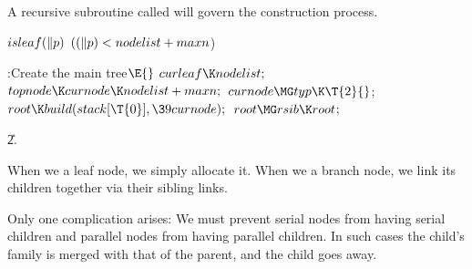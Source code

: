 A recursive subroutine called  will govern the
construction process.

\Y\B\4\D$\\{isleaf}(\|p)$ \5
$((\|p)<\\{nodelist}+\\{maxn}{}$)\par
\Y\B\4:Create the main tree\X${}\E{}$\6
$\\{curleaf}\K\\{nodelist};{}$\6
${}\\{topnode}\K\\{curnode}\K\\{nodelist}+\\{maxn};{}$\6
${}\\{curnode}\MG\\{typ}\K\T{2}{}$;\6
${}\\{root}\K\\{build}(\\{stack}[\T{0}],\39\\{curnode});{}$\6
${}\\{root}\MG\\{rsib}\K\\{root}{}$;\par
\U2.\fi

When we  a leaf node, we simply allocate it.
When we
 a branch node, we link its children together via their
sibling links.

Only one complication arises: We must prevent serial nodes
from having serial children and parallel nodes from having parallel
children. In such cases the child's family is merged with that of
the parent, and the child goes away.

